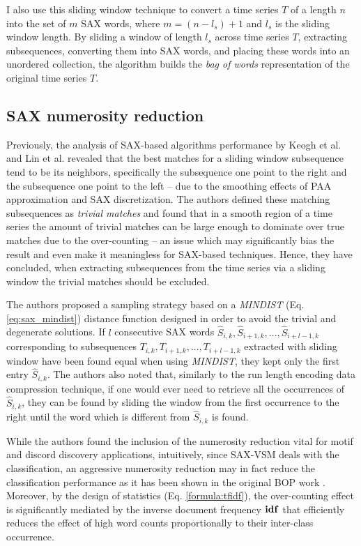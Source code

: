 I also use this sliding window technique to convert a time series $T$ of a length $n$ into 
the set of $m$ SAX words, where $m=(n-l_{s})+1$ and $l_{s}$ is the sliding window length. 
By sliding a window of length $l_{s}$ across time series $T$, extracting subsequences, 
converting them into SAX words, and placing these words into an unordered collection, 
the algorithm builds the \textit{bag of words} representation of the original time series $T$.

\subsection{SAX numerosity reduction}\label{section_numerosity_reduction}
Previously, the analysis of SAX-based algorithms performance by Keogh et al. \cite{citeulike:3977965} and 
Lin et al. \cite{citeulike:3175749} revealed that the best matches for a sliding window 
subsequence tend to be its neighbors, specifically the subsequence one point to the right and the subsequence 
one point to the left -- due to the smoothing effects of PAA approximation and SAX discretization. 
The authors defined these matching subsequences as \textit{trivial matches} and found that in a smooth region 
of a time series the amount of trivial matches can be large enough to dominate over true matches due to 
the over-counting -- an issue which may significantly bias the result and even make it meaningless 
\cite{citeulike:227029} for SAX-based techniques. 
Hence, they have concluded, when extracting subsequences from the time series via a sliding window 
the trivial matches should be excluded. 

The authors proposed a sampling strategy based on a \textit{MINDIST} (Eq. \ref{eq:sax_mindist}) distance 
function designed in order to avoid the trivial and degenerate solutions.
If $l$ consecutive SAX words \newline $\widehat{S}_{i,k}, \widehat{S}_{i+1,k},...,\widehat{S}_{i+l-1,k}$
corresponding to subsequences $T_{i,k}, T_{i+1,k},...,T_{i+l-1,k}$ extracted with sliding window have been
found equal when using \textit{MINDIST}, they kept only the first entry $\widehat{S}_{i,k}$. 
The authors also noted that, similarly to the run length encoding data compression technique, 
if one would ever need to retrieve all the occurrences of $\widehat{S}_{i,k}$, they can be found by sliding 
the window from the first occurrence to the right until the word which is different from $\widehat{S}_{i,k}$ 
is found. 

While the authors found the inclusion of the numerosity reduction vital for motif and discord discovery applications, 
intuitively, since SAX-VSM deals with the classification, an aggressive numerosity reduction may 
in fact reduce the classification performance as it has been shown in the original BOP work \cite{citeulike:10525778}. 
Moreover, by the design of \tfidf statistics (Eq. \ref{formula:tfidf}), the over-counting effect is significantly mediated 
by the inverse document frequency $\text{\textbf{idf}}$ that efficiently reduces the effect of high word counts 
proportionally to their inter-class occurrence.

